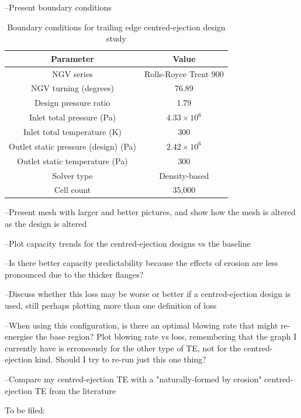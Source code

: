 \documentclass[a4paper, 11pt, twoside]{report}
\begin{document}
--Present boundary conditions

\begin{table}[H]
\caption{Boundary conditions for trailing edge centred-ejection design study}
\label{ps_cutbacks_parameters}
\begin{center}
\begin{tabular}{|c|c|}
\hline
Parameter & Value\\
\hline
NGV series & Rolls-Royce Trent 900\\
NGV turning (degrees) & 76.89\\
Design pressure ratio & 1.79\\
Inlet total pressure (Pa) & $4.33 \times 10^6$\\
Inlet total temperature (K) & 300\\
Outlet static pressure (design) (Pa) & $2.42 \times 10^6$\\
Outlet static temperature (Pa) & 300\\
Solver type & Density-based\\
Cell count & 35,000\\
\hline
\end{tabular}
\end{center}
\end{table}

--Present mesh with larger and better pictures, and show how the mesh is altered as the design is altered

--Plot capacity trends for the centred-ejection designs vs the baseline

--Is there better capacity predictability because the effects of erosion are less pronounced due to the thicker flanges?

--Discuss whether this loss may be worse or better if a centred-ejection design is used, still perhaps plotting more than one definition of loss

--When using this configuration, is there an optimal blowing rate that might re-energise the base region? Plot blowing rate vs loss, remembering that the graph I currently have is erroneously for the other type of TE, not for the centred-ejection kind. Should I try to re-run just this one thing?

--Compare my centred-ejection TE with a "naturally-formed by erosion" centred-ejection TE from the literature 


 
 


To be filed:
\end{document}
